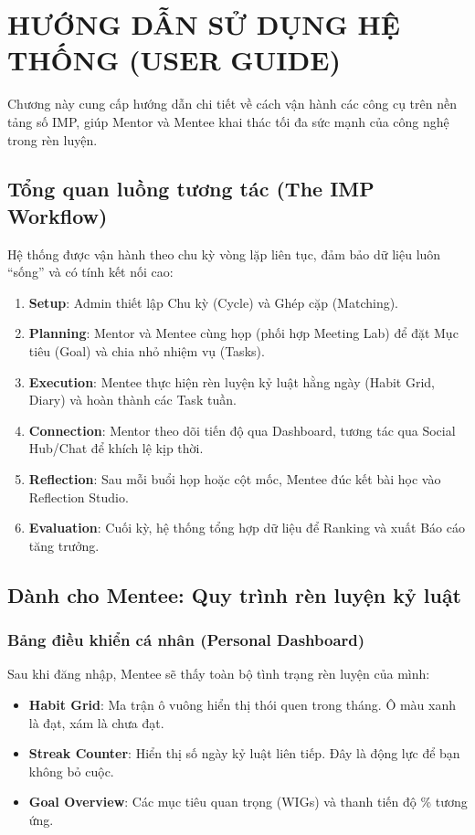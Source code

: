 \chapter{HƯỚNG DẪN SỬ DỤNG HỆ THỐNG (USER GUIDE)}

Chương này cung cấp hướng dẫn chi tiết về cách vận hành các công cụ trên nền tảng số IMP, giúp Mentor và Mentee khai thác tối đa sức mạnh của công nghệ trong rèn luyện.

\section{Tổng quan luồng tương tác (The IMP Workflow)}

Hệ thống được vận hành theo chu kỳ vòng lặp liên tục, đảm bảo dữ liệu luôn ``sống'' và có tính kết nối cao:
\begin{enumerate}[label=\textbf{B\arabic*.}]
    \item \textbf{Setup}: Admin thiết lập Chu kỳ (Cycle) và Ghép cặp (Matching).
    \item \textbf{Planning}: Mentor và Mentee cùng họp (phối hợp Meeting Lab) để đặt Mục tiêu (Goal) và chia nhỏ nhiệm vụ (Tasks).
    \item \textbf{Execution}: Mentee thực hiện rèn luyện kỷ luật hằng ngày (Habit Grid, Diary) và hoàn thành các Task tuần.
    \item \textbf{Connection}: Mentor theo dõi tiến độ qua Dashboard, tương tác qua Social Hub/Chat để khích lệ kịp thời.
    \item \textbf{Reflection}: Sau mỗi buổi họp hoặc cột mốc, Mentee đúc kết bài học vào Reflection Studio.
    \item \textbf{Evaluation}: Cuối kỳ, hệ thống tổng hợp dữ liệu để Ranking và xuất Báo cáo tăng trưởng.
\end{enumerate}

\section{Dành cho Mentee: Quy trình rèn luyện kỷ luật}

\subsection{Bảng điều khiển cá nhân (Personal Dashboard)}
Sau khi đăng nhập, Mentee sẽ thấy toàn bộ tình trạng rèn luyện của mình:
\begin{itemize}
    \item \textbf{Habit Grid}: Ma trận ô vuông hiển thị thói quen trong tháng. Ô màu xanh là đạt, xám là chưa đạt.
    \item \textbf{Streak Counter}: Hiển thị số ngày kỷ luật liên tiếp. Đây là động lực để bạn không bỏ cuộc.
    \item \textbf{Goal Overview}: Các mục tiêu quan trọng (WIGs) và thanh tiến độ \% tương ứng.
\end{itemize}

